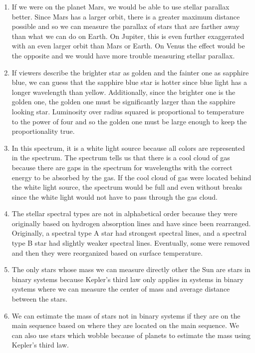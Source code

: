 \documentclass[../hw2.tex]{subfiles}
\begin{document}
    \begin{enumerate}
        \item If we were on the planet Mars, we would be able to use stellar parallax better. Since Mars has a larger orbit, there is a greater maximum distance possible and so we can measure the parallax of stars that are farther away than what we can do on Earth. On Jupiter, this is even further exaggerated with an even larger orbit than Mars or Earth. On Venus the effect would be the opposite and we would have more trouble measuring stellar parallax. 
        \item If viewers describe the brighter star as golden and the fainter one as sapphire blue, we can guess that the sapphire blue star is hotter since blue light has a longer wavelength than yellow. Additionally, since the brighter one is the golden one, the golden one must be significantly larger than the sapphire looking star. Luminosity over radius squared is proportional to temperature to the power of four and so the golden one must be large enough to keep the proportionality true.
        \item In this spectrum, it is a white light source because all colors are represented in the spectrum. The spectrum tells us that there is a cool cloud of gas because there are gaps in the spectrum for wavelengths with the correct energy to be absorbed by the gas. If the cool cloud of gas were located behind the white light source, the spectrum would be full and even without breaks since the white light would not have to pass through the gas cloud.
        \item The stellar spectral types are not in alphabetical order because they were originally based on hydrogen absorption lines and have since been rearranged. Originally, a spectral type A star had strongest spectral lines, and a spectral type B star had slightly weaker spectral lines. Eventually, some were removed and then they were reorganized based on surface temperature.
        \item The only stars whose mass we can measure directly other the Sun are stars in binary systems because Kepler's third law only applies in systems in binary systems where we can measure the center of mass and average distance between the stars. 
        \item We can estimate the mass of stars not in binary systems if they are on the main sequence based on where they are located on the main sequence. We can also use stars which wobble because of planets to estimate the mass using Kepler's third law.
    \end{enumerate}
\end{document}
